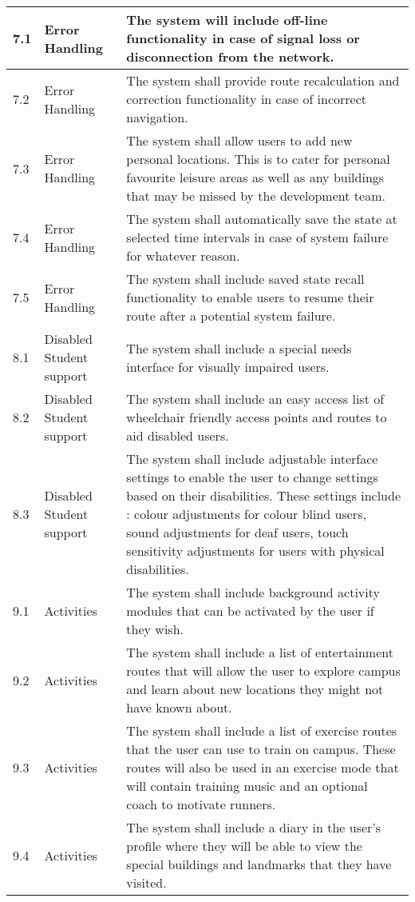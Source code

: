 \documentclass[12pt,a4paper]{report}
\begin{document}
\begin{longtable}{|p{}| p{} | p{} |}
\hline
7.1& Error Handling & The system will include off-line functionality in case of signal loss or disconnection from the network.\\
\hline
7.2& Error Handling & The system shall provide route recalculation and correction functionality in case of incorrect navigation.\\
\hline
7.3& Error Handling & The system shall allow users to add new personal locations. This is to cater for personal favourite leisure areas as well as any buildings that may be missed by the development team. \\
\hline
7.4& Error Handling & The system shall automatically save the state at selected time intervals in case of system failure for whatever reason.\\
\hline
7.5& Error Handling & The system shall include saved state recall functionality to enable users to resume their route after a potential system failure.\\
\hline
8.1& Disabled Student support & The system shall include a special needs interface for visually impaired users.\\
\hline
8.2& Disabled Student support & The system shall include an easy access list of wheelchair friendly access points and routes to aid disabled users.\\
\hline
8.3& Disabled Student support & The system shall include adjustable interface settings to enable  the user to change settings based on their disabilities. These settings include : colour adjustments for colour blind users, sound adjustments for deaf users, touch sensitivity adjustments for users with physical disabilities.\\
\hline
9.1& Activities & The system shall include background activity modules that can be activated by the user if they wish.\\
\hline
9.2& Activities & The system shall include a list of entertainment routes that will allow the user to explore campus and learn about new locations they might not have known about.\\
\hline
9.3& Activities & The system shall include a list of exercise routes that the user can use to train on campus. These routes will also be used in an exercise mode that will contain training music and an optional coach to motivate runners.\\
\hline
9.4& Activities & The system shall include a diary in the user's profile where they will be able to view the special buildings and landmarks that they have visited.\\

\end{longtable}
\end{document}
